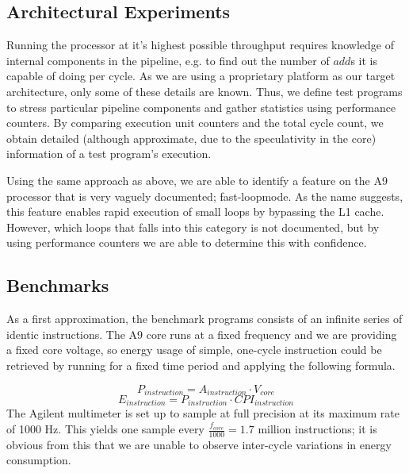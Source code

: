 \subsection{Architectural Experiments}
Running the processor at it's highest possible throughput requires knowledge of
internal components in the pipeline, e.g. to find out the number of $add$s it is
capable of doing per cycle. As we are using a proprietary platform as our target
architecture, only some of these details are known. Thus, we define test
programs to stress particular pipeline components and gather statistics using
performance counters. By comparing execution unit counters and the total cycle
count, we obtain detailed (although approximate, due to the speculativity in the
core) information of a test program's execution.

Using the same approach as above, we are able to identify a feature on the A9
processor that is very vaguely documented; fast-loop\texttrademark mode. As the
name suggests, this feature enables rapid execution of small loops by bypassing
the L1 cache.  However, which loops that falls into this category is not
documented, but by using performance counters we are able to determine this with
confidence.


\subsection{Benchmarks}
As a first approximation, the benchmark programs consists of an infinite series
of identic instructions. The A9 core runs at a fixed frequency and we are
providing a fixed core voltage, so energy usage of simple, one-cycle instruction
could be retrieved by running for a fixed time period and applying the following
formula.

\begin{equation}
    P_{instruction} = A_{instruction} \cdot V_{core}
\end{equation}
\begin{equation}
    E_{instruction} = P_{instruction} \cdot CPI_{instruction}
\end{equation}
The Agilent multimeter is set up to sample at full precision at its maximum rate
of 1000 Hz. This yields one sample every $\frac{ f_{core} }{ 1000 } = 1.7$
million instructions; it is obvious from this that we are unable to observe
inter-cycle variations in energy consumption.

